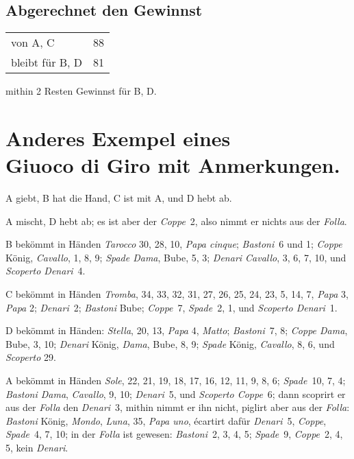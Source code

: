 \documentclass[11pt,a6paper,twoside]{article}
\begin{document}
\subsection{Abgerechnet den Gewinnst}

\begin{tabular}{@{}b{6.5cm}r}
  von A, C &88\\
bleibt für B, D &81\\
\end{tabular}

mithin 2 Resten Gewinnst für B, D.

\section*{Anderes Exempel eines\\ Giuoco di Giro mit Anmerkungen.}

A giebt, B hat die Hand, C ist mit A, und D hebt ab.

A mischt, D hebt ab; es ist aber der \textit{Coppe}~2, also nimmt er nichts aus der \textit{Folla}.

B bekömmt in Händen \textit{Tarocco} 30, 28, 10, \textit{Papa cinque}; \textit{Bastoni}~6 und 1; \textit{Coppe} König, \textit{Cavallo}, 1, 8, 9; \textit{Spade Dama}, Bube, 5, 3; \textit{Denari Cavallo}, 3, 6, 7, 10, und \textit{Scoperto Denari}~4.

C bekömmt in Händen \textit{Tromba}, 34, 33, 32, 31, 27, 26, 25, 24, 23, 5, 14, 7, \textit{Papa} 3, \textit{Papa} 2; \textit{Denari}~2; \textit{Bastoni} Bube; \textit{Coppe}~7, \textit{Spade}~2, 1, und \textit{Scoperto Denari}~1.

D bekömmt in Händen: \textit{Stella}, 20, 13, \textit{Papa} 4, \textit{Matto}; \textit{Bastoni}~7, 8; \textit{Coppe Dama}, Bube, 3, 10; \textit{Denari} König, \textit{Dama}, Bube, 8, 9; \textit{Spade} König, \textit{Cavallo}, 8, 6, und \textit{Scoperto} 29.

A bekömmt in Händen \textit{Sole}, 22, 21, 19, 18, 17, 16, 12, 11, 9, 8, 6; \textit{Spade}~10, 7, 4; \textit{Bastoni Dama}, \textit{Cavallo}, 9, 10; \textit{Denari}~5, und \textit{Scoperto Coppe}~6; dann scoprirt er aus der \textit{Folla} den \textit{Denari}~3, mithin nimmt er ihn nicht, piglirt aber aus der \textit{Folla}: \textit{Bastoni} König, \textit{Mondo}, \textit{Luna}, 35, \textit{Papa uno}, écartirt dafür \textit{Denari}~5, \textit{Coppe}, \textit{Spade}~4, 7, 10; in der \textit{Folla} ist gewesen: \textit{Bastoni}~2, 3, 4, 5; \textit{Spade}~9, \textit{Coppe}~2, 4, 5, kein \textit{Denari}.
\end{document}
